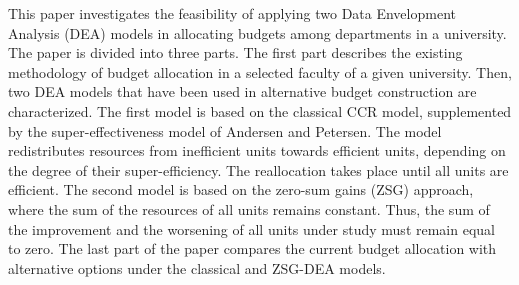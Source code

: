 
\begin{Abstrakt}
    This paper investigates the feasibility of applying two Data Envelopment Analysis (DEA) models in allocating budgets among departments in a university. The paper is divided into three parts. The first part describes the existing methodology of budget allocation in a selected faculty of a given university. Then, two DEA models that have been used in alternative budget construction are characterized. The first model is based on the classical CCR model, supplemented by the super-effectiveness model of Andersen and Petersen. The model redistributes resources from inefficient units towards efficient units, depending on the degree of their super-efficiency. The reallocation takes place until all units are efficient. The second model is based on the zero-sum gains (ZSG) approach, where the sum of the resources of all units remains constant. Thus, the sum of the improvement and the worsening of all units under study must remain equal to zero. The last part of the paper compares the current budget allocation with alternative options under the classical and ZSG-DEA models.
\end{Abstrakt}



\clearpage